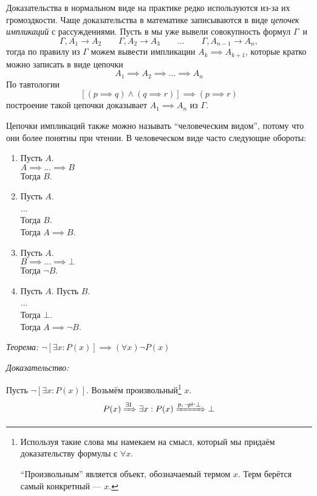Доказательства в нормальном виде на практике редко используются из-за их
громоздкости.
Чаще доказательства в математике записываются в виде {\it цепочек импликаций}
с рассуждениями.
Пусть в мы уже вывели совокупность формул $\Gamma$~и
\[
	\Gamma,A_1\to A_2\qquad \Gamma,A_2\to A_3
	\qquad  ... \qquad \Gamma,A_{n-1}\to A_{n},
\]
тогда по правилу \implic{} из $\Gamma$ можем вывести импликации
${A_{k}\implies A_{k+1}}$, которые кратко можно записать в виде цепочки
\[
	A_1\implies A_2\implies ...\implies A_{n}
\]
По тавтологии
\[
	[(p\implies q)\land (q\implies r)]\implies (p\implies r)
\]
построение такой цепочки доказывает $A_1\implies A_{n}$ из $\Gamma$.

Цепочки импликаций также можно называть ``человеческим видом'', потому что они более
понятны при чтении.
В человеческом виде часто следующие обороты:
\begin{fullwidth}
	\begin{multicols}{4}
		\begin{enumerate}[label=(\roman*)]
			\item{}
				Пусть $A$.\\
				$A\implies...\implies B$\\
				Тогда $B$.
			\item{}
				Пусть $A$.\\
				...\\
				Тогда $B$.\\
				Тогда $A\implies B$.
			\item{}
				Пусть $A$.\\
				$B\implies ...\implies \bot$\\
				Тогда $\lnot B$.
			\item{}
				Пусть $A$. Пусть $B$.\\
				...\\
				Тогда $\bot$.\\
				Тогда $A\implies \lnot B$.
		\end{enumerate}
	\end{multicols}
\end{fullwidth}

{\it Теорема:} $\lnot[\exists x:P(x)]\implies (\forall x)\lnot P(x)$

{\it Доказательство:}

Пусть ${\lnot[\exists x:P(x)]}$.
Возьмём произвольный\footnote{
	Используя такие слова мы намекаем на смысл, который мы придаём доказательству
	формулы с $\forall x$.

	``Произвольным'' является объект, обозначаемый термом $x$.
	Терм берётся самый конкретный --- $x$.} $x$.
\[
	P(x)\xRightarrow{\text{$\exists$I}} \exists x:P(x)
	\xRightarrow{p,\lnot p\vdash\bot} \bot
\]

